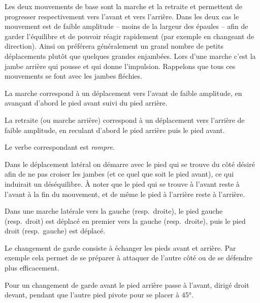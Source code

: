 Les deux mouvements de base sont la marche et la retraite et permettent de progresser respectivement vers l'avant et vers l'arrière.
Dans les deux cas le mouvement est de faible amplitude -- moins de la largeur des épaules -- afin de garder l'équilibre et de pouvoir réagir rapidement (par exemple en changeant de direction).
Ainsi on préférera généralement un grand nombre de petits déplacements plutôt que quelques grandes enjambées.
Lors d'une marche c'est la jambe arrière qui pousse et qui donne l'impulsion.
Rappelons que tous ces mouvements se font avec les jambes fléchies.


\begin{definition}[Marche]

	La marche correspond à un déplacement vers l'avant de faible amplitude, en avançant d'abord le pied avant suivi du pied arrière.
\end{definition}


\begin{definition}[Retraite]

	La retraite (ou marche arrière) correspond à un déplacement vers l'arrière de faible amplitude, en reculant d'abord le pied arrière puis le pied avant.

	Le verbe correspondant est \emph{rompre}.
\end{definition}


Dans le déplacement latéral on démarre avec le pied qui se trouve du côté désiré afin de ne pas croiser les jambes (et ce quel que soit le pied avant), ce qui induirait un déséquilibre.
À noter que le pied qui se trouve à l'avant reste à l'avant à la fin du mouvement, et de même le pied à l'arrière reste à l'arrière.

\begin{definition}

	Dans une marche latérale vers la gauche (resp.\ droite), le pied gauche (resp.\ droit) est déplacé en premier vers la gauche (resp.\ droite), puis le pied droit (resp.\ gauche) est déplacé.
\end{definition}


Le changement de garde consiste à échanger les pieds avant et arrière.
Par exemple cela permet de se préparer à attaquer de l'autre côté ou de se défendre plus efficacement.


\begin{definition}
	\label{dep:def:changement-garde-avant}

	Pour un changement de garde avant le pied arrière passe à l'avant, dirigé droit devant, pendant que l'autre pied pivote pour se placer à 45°.
\end{definition}


